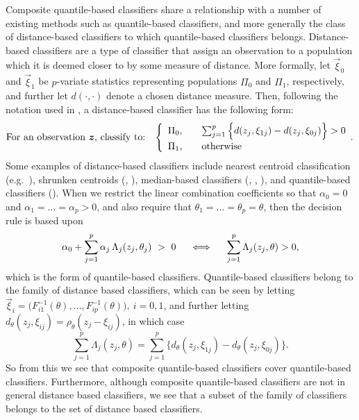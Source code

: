 Composite quantile-based classifiers share a relationship with a number of
existing methods such as quantile-based classifiers, and more generally the
class of distance-based classifiers to which quantile-based classifiers belongs.
Distance-based classifiers are a type of classifier that assign an observation
to a population which it is deemed closer to by some measure of distance.  More
formally, let $\vec{\xi}_0$ and $\vec{\xi}_1$ be $p$-variate statistics
representing populations $\Pi_0$ and $\Pi_1$, respectively, and further let
$d(\cdot, \cdot)$ denote a chosen distance measure. Then, following the notation
used in \cite{hennig2016}, a distance-based classifier has the following form:
\begin{equation}
  \label{eq:distance-based-classifier}
  \text{For an observation $\vec{z}$, classify to:}  \hspace{3mm}
  \left\{
    \begin{array}{lll}
      \Pi_0, & & \sum_{j=1}^p
                 \Big\{
                 d(z_j, \xi_{1j}) - d(z_j, \xi_{0j})
                 \Big\} > 0 \\[1ex]
      \Pi_1, & & \text{otherwise}
    \end{array}.
  \right.
\end{equation}
Some examples of distance-based classifiers include nearest centroid
classification (e.g.\ \cite{hastie2009}), shrunken centroids
(\cite{tibshirani2002}, \cite{wang2007}), median-based classifiers
(\cite{jornsten2004}, \cite{ghosh2005}, \cite{hall2012}), and quantile-based
classifiers (\cite{hennig2016}).  When we restrict the linear combination
coefficients so that $\alpha_0 = 0$ and $\alpha_1 = \dots = \alpha_p > 0$, and
also require that $\theta_1 = \dots = \theta_p = \theta$, then the decision rule
is based upon
\begin{equation}
  \label{eq:boundary-equivalence}
  \alpha_0 + \sum_{j=1}^p \alpha_j \, \Lambda_j (z_j, \theta_j) ~>~ 0
  \hspace{5mm} \Longleftrightarrow \hspace{5mm}
  \sum_{j=1}^p \Lambda_j (z_j, \theta) > 0,
\end{equation}
which is the form of quantile-based classifiers.  Quantile-based classifiers
belong to the family of distance based classifiers, which can be seen by letting
$\vec{\xi}_i = \Big(F_{i1}^{-1}(\theta), \dots, F_{ip}^{-1}(\theta) \Big),~ i =
0, 1$, and further letting
$d_\theta(z_j, \xi_{ij}) = \rho_{\theta}(z_j - \xi_{ij})$, in which case
\begin{equation}
  \label{eq:quantile-is-distance-subset}
  \sum_{j=1}^p \Lambda_j (z_j, \theta) = \sum_{j=1}^p \Big\{ d_{\theta}(z_j,
  \xi_{1j}) - d_{\theta}(z_j, \xi_{0j}) \Big\}.
\end{equation}
So from this we see that composite quantile-based classifiers cover
quantile-based classifiers.  Furthermore, although composite quantile-based
classifiers are not in general distance based classifiers, we see that a subset
of the family of classifiers belongs to the set of distance based classifiers.

